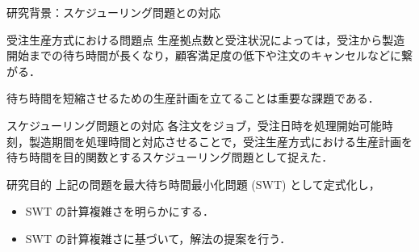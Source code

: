 \documentclass[dvipdfmx]{beamer}
\begin{document}
    \begin{frame}{研究背景：スケジューリング問題との対応}
      \begin{block}{受注生産方式における問題点}
        生産拠点数と受注状況によっては，受注から製造開始までの\alert{待ち時間}が長くなり，顧客満足度の低下や注文のキャンセルなどに繋がる．
      \end{block}

      待ち時間を短縮させるための生産計画を立てることは重要な課題である．

      \begin{block}{スケジューリング問題との対応}
        各注文を\alert{ジョブ}，受注日時を\alert{処理開始可能時刻}，製造期間を\alert{処理時間}と対応させることで，受注生産方式における生産計画を\alert{待ち時間}を目的関数とするスケジューリング問題として捉えた．
      \end{block}

      \begin{block}{研究目的}
        上記の問題を\alert{最大待ち時間最小化問題 (SWT)} として定式化し，
        \begin{itemize}
          \item SWT の計算複雑さを明らかにする．
          \item SWT の計算複雑さに基づいて，解法の提案を行う．
        \end{itemize}
      \end{block}

    \end{frame}
\end{document}
